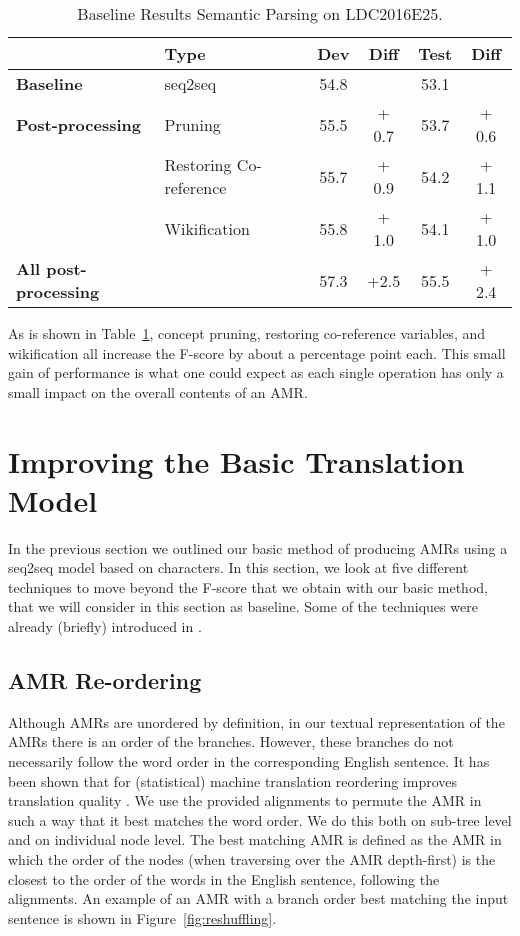 \documentclass[a4paper,10pt,twoside]{article}
\begin{document}
\begin{table}[h]
\centering
\caption{\label{tab:baseline}Baseline Results Semantic Parsing on LDC2016E25.}
\begin{tabular}{ll|cc|cc}
\toprule
                          & \textbf{Type} & \textbf{Dev} & \textbf{Diff}  & \textbf{Test} & \textbf{Diff} \\ \midrule
\textbf{Baseline}         & seq2seq                      & 54.8  &         & 53.1    &           \\ \midrule
\textbf{Post-processing}  & Pruning                      & 55.5  &  + 0.7  & 53.7    & + 0.6     \\
                          & Restoring Co-reference       & 55.7  &  + 0.9  & 54.2    & + 1.1     \\
                          & Wikification                 & 55.8  &  + 1.0  & 54.1    & + 1.0     \\
\midrule
\textbf{All post-processing} & & 57.3 & +2.5 & 55.5  & + 2.4  \\
\bottomrule
\end{tabular}
\end{table}

As is shown in Table~\ref{tab:baseline}, concept pruning, restoring co-reference variables, and wikification all increase the F-score by about a percentage point each. This small gain of performance is what one could expect as each single operation has only a small impact on the overall contents of an AMR.

\section{Improving the Basic Translation Model} 

In the previous section we outlined our basic method of producing AMRs using a seq2seq model based on characters. In this section, we look at five different techniques to move beyond the F-score that we obtain with our basic method, that we will consider in this section as baseline. Some of the techniques were already (briefly) introduced in . 

\subsection{AMR Re-ordering} 

Although AMRs are unordered by definition, in our textual representation of the AMRs there is an order of the branches. However, these branches do not necessarily follow the word order in the corresponding English sentence. It has been shown that for (statistical) machine translation reordering improves translation quality \cite{collins2005clause}. We use the provided alignments to permute the AMR in such a way that it best matches the word order. We do this both on sub-tree level and on individual node level. The best matching AMR is defined as the AMR in which the order of the nodes (when traversing over the AMR depth-first) is the closest to the order of the words in the English sentence, following the alignments. An example of an AMR with a branch order best matching the input sentence is shown in Figure~\ref{fig:reshuffling}.
\end{document}
